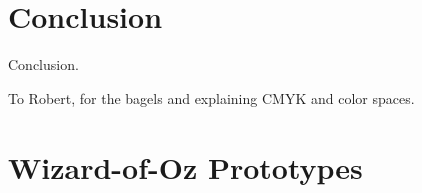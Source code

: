 \documentclass[manuscript,review]{acmart}
\begin{document}
\section{Conclusion}
Conclusion.









\begin{acks}
To Robert, for the bagels and explaining CMYK and color spaces.
\end{acks}












\appendix

\section{Wizard-of-Oz Prototypes}
\end{document}
